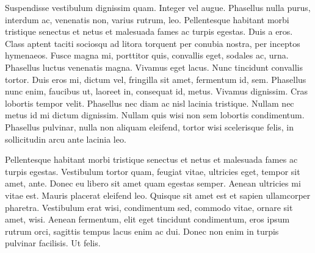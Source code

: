 
Suspendisse vestibulum dignissim quam. Integer vel augue. Phasellus nulla purus, interdum ac, venenatis non, varius rutrum, leo. Pellentesque habitant morbi tristique senectus et netus et malesuada fames ac turpis egestas. Duis a eros. Class aptent taciti sociosqu ad litora torquent per conubia nostra, per inceptos hymenaeos. Fusce magna mi, porttitor quis, convallis eget, sodales ac, urna. Phasellus luctus venenatis magna. Vivamus eget lacus. Nunc tincidunt convallis tortor. Duis eros mi, dictum vel, fringilla sit amet, fermentum id, sem. Phasellus nunc enim, faucibus ut, laoreet in, consequat id, metus. Vivamus dignissim. Cras lobortis tempor velit. Phasellus nec diam ac nisl lacinia tristique. Nullam nec metus id mi dictum dignissim. Nullam quis wisi non sem lobortis condimentum. Phasellus pulvinar, nulla non aliquam eleifend, tortor wisi scelerisque felis, in sollicitudin arcu ante lacinia leo.

Pellentesque habitant morbi tristique senectus et netus et malesuada fames ac turpis egestas. Vestibulum tortor quam, feugiat vitae, ultricies eget, tempor sit amet, ante. Donec eu libero sit amet quam egestas semper. Aenean ultricies mi vitae est. Mauris placerat eleifend leo. Quisque sit amet est et sapien ullamcorper pharetra. Vestibulum erat wisi, condimentum sed, commodo vitae, ornare sit amet, wisi. Aenean fermentum, elit eget tincidunt condimentum, eros ipsum rutrum orci, sagittis tempus lacus enim ac dui. Donec non enim in turpis pulvinar facilisis. Ut felis.

